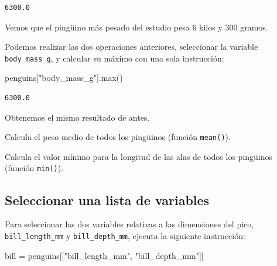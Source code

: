 \documentclass[
  a4paper,
  noprof,
  12pt,
  notoc,
  nosols,
  nobib]{mnye}
\newenvironment{Shaded}{\begin{snugshade}}{\end{snugshade}}
\newcommand{\BuiltInTok}[1]{\textcolor[rgb]{0.00,0.23,0.31}{#1}}
\newcommand{\NormalTok}[1]{\textcolor[rgb]{0.00,0.23,0.31}{#1}}
\newcommand{\OperatorTok}[1]{\textcolor[rgb]{0.37,0.37,0.37}{#1}}
\newcommand{\StringTok}[1]{\textcolor[rgb]{0.13,0.47,0.30}{#1}}
\renewenvironment{exercise}[1][]{
            \if\relax\detokenize{#1}\relax
                \ex
            \else
                \ex[note={#1}]
            \fi
        }{\endex}
\theoremstyle{definition}
\newtheorem{exercise}{Ejercicio}[section]
\theoremstyle{remark}
\begin{document}
\begin{verbatim}
6300.0
\end{verbatim}

Vemos que el pingüino más pesado del estudio pesa \(6\) kilos y \(300\)
gramos.

Podemos realizar las dos operaciones anteriores, seleccionar la variable
\texttt{body\_mass\_g}, y calcular su máximo con una sola instrucción:

\begin{Shaded}
\begin{Highlighting}[]
\NormalTok{penguins[}\StringTok{"body\_mass\_g"}\NormalTok{].}\BuiltInTok{max}\NormalTok{()}
\end{Highlighting}
\end{Shaded}

\begin{verbatim}
6300.0
\end{verbatim}

Obtenemos el mismo resultado de antes.

\begin{exercise}[]%
\protect\hypertarget{exr-subset-variable-1}{}\label{exr-subset-variable-1}%
Calcula el peso medio de todos los pingüinos (función \texttt{mean()}).

\end{exercise}

\begin{exercise}[]%
\protect\hypertarget{exr-subset-variable-2}{}\label{exr-subset-variable-2}%
Calcula el valor mínimo para la longitud de las alas de todos los
pingüinos (función \texttt{min()}).

\end{exercise}

\subsection{Seleccionar una lista de
variables}\label{sec-subset-several-variables}

Para seleccionar las dos variables relativas a las dimensiones del pico,
\texttt{bill\_length\_mm} y \texttt{bill\_depth\_mm}, ejecuta la
siguiente instrucción:

\begin{Shaded}
\begin{Highlighting}[]
\NormalTok{bill }\OperatorTok{=}\NormalTok{ penguins[[}\StringTok{"bill\_length\_mm"}\NormalTok{, }\StringTok{"bill\_depth\_mm"}\NormalTok{]]}
\end{Highlighting}
\end{Shaded}
\end{document}
